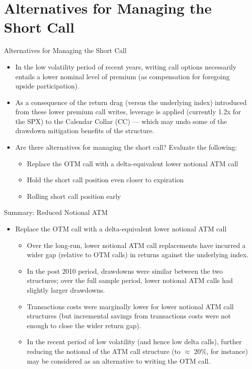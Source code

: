 \documentclass{beamer}
\begin{document}
\section{Alternatives for Managing the Short Call}
\begin{frame}{Alternatives for Managing the Short Call}
\begin{itemize}
\item In the low volatility period of recent years, writing call options necessarily entails a lower nominal level of premium (as compensation for foregoing upside participation). 
\vfill 
\item As a consequence of the return drag (versus the underlying index) introduced from these lower premium call writes, leverage is applied (currently 1.2x for the SPX) to the Calendar Collar (CC) --- which may undo some of the drawdown mitigation benefits of the structure. 
\vfill
\item Are there alternatives for managing the short call? Evaluate the following:
\begin{itemize}
\item Replace the OTM call with a delta-equivalent lower notional ATM call
\item Hold the short call position even closer to expiration
\item Rolling short call position early
\vfill
\end{itemize}
\end{itemize}
\end{frame}

\begin{frame}{Summary: Reduced Notional ATM}
\begin{itemize}
\item Replace the OTM call with a delta-equivalent lower notional ATM call
\begin{itemize}
\item Over the long-run, lower notional ATM call replacements have incurred a wider gap (relative to OTM calls) in returns against the underlying index. 
\vfill
\item In the post 2010 period, drawdowns were similar between the two structures; over the full sample period, lower notional ATM calls had slightly larger drawdowns.
\vfill
\item Transactions costs were marginally lower for lower notional ATM call structures (but incremental savings from transactions costs were not enough to close the wider return gap).
\vfill
\item In the recent period of low volatility (and hence low delta calls), further reducing the notional of the ATM call structure (to $ \approx$ 20\%, for instance) may be considered as an alternative to writing the OTM call. 
\end{itemize}
\end{itemize}
\end{frame}
\end{document}
